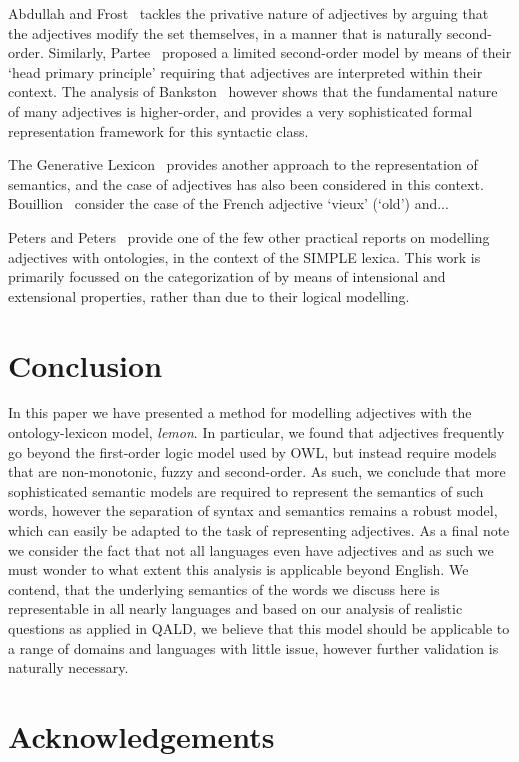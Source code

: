 \documentclass[11pt]{article}
\begin{document}
Abdullah and Frost~ tackles the privative nature of adjectives by arguing that the adjectives modify the set themselves, in a manner that is naturally second-order. Similarly, Partee~ proposed a limited second-order model by means of their `head primary principle' requiring that adjectives are interpreted within their context. The analysis of Bankston~ however shows that the fundamental nature of many adjectives is higher-order, and provides a very sophisticated formal representation framework for this syntactic class.

The Generative Lexicon~\cite{pustejovsky1991generative} provides another approach to the representation of semantics, and the case of adjectives has also been considered in this context. Bouillion~ consider the case of the French adjective `vieux' (`old') and...

\cite{morzycki2013modification}

\cite{mcnally2004relational}

Peters and Peters~ provide one of the few other practical reports on modelling adjectives with ontologies, in the context of the SIMPLE lexica. This work is primarily focussed on the categorization of by means of intensional and extensional properties, rather than due to their logical modelling. 

\section{Conclusion}

In this paper we have presented a method for modelling adjectives with the
ontology-lexicon model, \emph{lemon}. In particular, we found that adjectives
frequently go beyond the first-order logic model used by OWL, but instead 
require models that are non-monotonic, fuzzy and second-order. As such, we 
conclude that more sophisticated semantic models are required to represent the semantics
of such words, however the separation of syntax and semantics remains a robust
model, which can easily be adapted to the task of representing adjectives. As 
a final note we consider the fact that not all languages even have adjectives
\cite{?} and as such we must wonder to what extent this analysis is applicable
beyond English. We contend, that the underlying semantics of the words we discuss here
is representable in all nearly languages and based on our analysis of realistic
questions as applied in QALD, we believe that this model should be applicable
to a range of domains and languages with little issue, however further 
validation is naturally necessary.

\section*{Acknowledgements}



\end{document}
